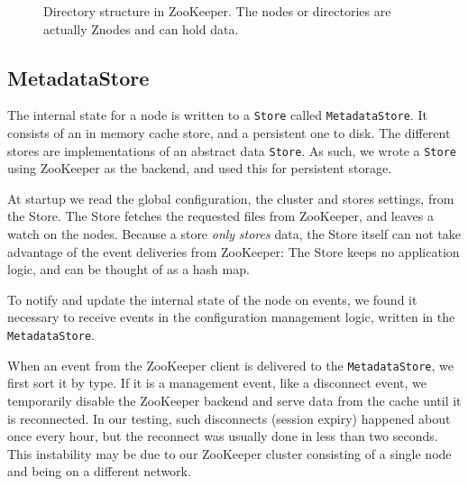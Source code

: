 \begin{figure}[h]
\caption{Directory structure in ZooKeeper. The nodes or directories are actually Znodes and can hold data.}
\label{fig:dirstruct}
\end{figure}

\subsection{MetadataStore}
The internal state for a node is written to a \texttt{Store} called \texttt{MetadataStore}. It consists of an in memory cache store, and a persistent one to disk. The different stores are implementations of an abstract data \texttt{Store}. As such, we wrote a \texttt{Store} using ZooKeeper as the backend, and used this for persistent storage.

At startup we read the global configuration, the cluster and stores settings, from the Store. The Store fetches the requested files from ZooKeeper, and leaves a watch on the nodes. Because a store \emph{only} \emph{stores} data, the Store itself can not take advantage of the event deliveries from ZooKeeper: The Store keeps no application logic, and can be thought of as a hash map.

To notify and update the internal state of the node on events, we found it necessary to receive events in the configuration management logic, written in the \texttt{MetadataStore}.

When an event from the ZooKeeper client is delivered to the \texttt{MetadataStore}, we first sort it by type.
If it is a management event, like a disconnect event, we temporarily disable the ZooKeeper backend and serve data from the cache until it is reconnected. In our testing, such disconnects (session expiry) happened about once every hour, but the reconnect was usually done in less than two seconds. This instability may be due to our ZooKeeper cluster consisting of a single node and being on a different network.

